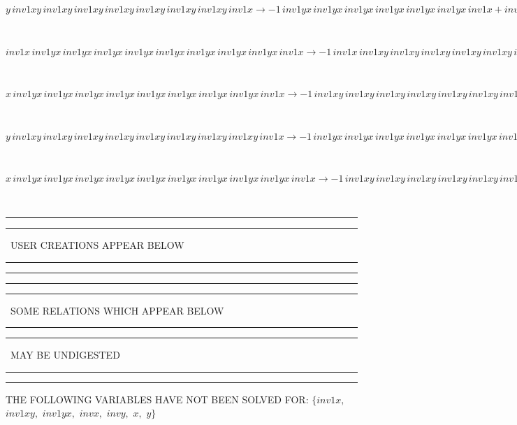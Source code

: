 \begin{minipage}{6in}
$
y\,
 inv1xy\,
 inv1xy\,
 inv1xy\,
 inv1xy\,
 inv1xy\,
 inv1xy\,
 inv1xy\,
 inv1x\rightarrow -1\,
 inv1yx\,
 inv1yx\,
 inv1yx\,
 inv1yx\,
 inv1yx\,
 inv1yx\,
 inv1x + inv1yx\,
 inv1yx\,
 inv1yx\,
 inv1yx\,
 inv1yx\,
 inv1yx\,
 inv1yx\,
 inv1x + y\,
 inv1xy\,
 inv1xy\,
 inv1xy\,
 inv1xy\,
 inv1xy\,
 inv1xy\,
 inv1xy
$
\end{minipage}\medskip \\
\begin{minipage}{6in}
$
inv1x\,
 inv1yx\,
 inv1yx\,
 inv1yx\,
 inv1yx\,
 inv1yx\,
 inv1yx\,
 inv1yx\,
 inv1yx\,
 inv1x\rightarrow -1\,
 inv1x\,
 inv1xy\,
 inv1xy\,
 inv1xy\,
 inv1xy\,
 inv1xy\,
 inv1xy\,
 inv1xy\,
 inv1xy + inv1yx\,
 inv1yx\,
 inv1yx\,
 inv1yx\,
 inv1yx\,
 inv1yx\,
 inv1yx\,
 inv1yx\,
 inv1x + inv1x\,
 inv1xy\,
 inv1xy\,
 inv1xy\,
 inv1xy\,
 inv1xy\,
 inv1xy\,
 inv1xy\,
 inv1xy\,
 inv1x
$
\end{minipage}\medskip \\
\begin{minipage}{6in}
$
x\,
 inv1yx\,
 inv1yx\,
 inv1yx\,
 inv1yx\,
 inv1yx\,
 inv1yx\,
 inv1yx\,
 inv1yx\,
 inv1x\rightarrow -1\,
 inv1xy\,
 inv1xy\,
 inv1xy\,
 inv1xy\,
 inv1xy\,
 inv1xy\,
 inv1xy\,
 inv1xy + inv1xy\,
 inv1xy\,
 inv1xy\,
 inv1xy\,
 inv1xy\,
 inv1xy\,
 inv1xy\,
 inv1xy\,
 inv1x
$
\end{minipage}\medskip \\
\begin{minipage}{6in}
$
y\,
 inv1xy\,
 inv1xy\,
 inv1xy\,
 inv1xy\,
 inv1xy\,
 inv1xy\,
 inv1xy\,
 inv1xy\,
 inv1x\rightarrow -1\,
 inv1yx\,
 inv1yx\,
 inv1yx\,
 inv1yx\,
 inv1yx\,
 inv1yx\,
 inv1yx\,
 inv1x + inv1yx\,
 inv1yx\,
 inv1yx\,
 inv1yx\,
 inv1yx\,
 inv1yx\,
 inv1yx\,
 inv1yx\,
 inv1x + y\,
 inv1xy\,
 inv1xy\,
 inv1xy\,
 inv1xy\,
 inv1xy\,
 inv1xy\,
 inv1xy\,
 inv1xy
$
\end{minipage}\medskip \\
\begin{minipage}{6in}
$
x\,
 inv1yx\,
 inv1yx\,
 inv1yx\,
 inv1yx\,
 inv1yx\,
 inv1yx\,
 inv1yx\,
 inv1yx\,
 inv1yx\,
 inv1x\rightarrow -1\,
 inv1xy\,
 inv1xy\,
 inv1xy\,
 inv1xy\,
 inv1xy\,
 inv1xy\,
 inv1xy\,
 inv1xy\,
 inv1xy + inv1xy\,
 inv1xy\,
 inv1xy\,
 inv1xy\,
 inv1xy\,
 inv1xy\,
 inv1xy\,
 inv1xy\,
 inv1xy\,
 inv1x
$
\end{minipage}\\
\rule[2pt]{6in}{1pt}\hfil\break
\rule[2.5pt]{1.701in}{1pt}
\ USER CREATIONS APPEAR BELOW\ 
\rule[2.5pt]{1.701in}{1pt}\hfil\break
\rule[2pt]{6in}{1pt}\hfil\break
\rule[2pt]{6in}{4pt}\hfil\break
\rule[2pt]{1.45in}{4pt}
\ SOME RELATIONS WHICH APPEAR BELOW\ 
\rule[2pt]{1.45in}{4pt}\hfil\break
\rule[2pt]{2.18in}{4pt}
\ MAY BE UNDIGESTED\ 
\rule[2pt]{2.18in}{4pt}\hfil\break
\rule[2pt]{6in}{4pt}\hfil\break
THE FOLLOWING VARIABLES HAVE NOT BEEN SOLVED FOR:\hfil\break
$\{inv1x,
$ $
inv1xy,
$ $
inv1yx,
$ $
invx,
$ $
invy,
$ $
x,
$ $
y\}$
\smallskip\\
\vspace{10pt}

